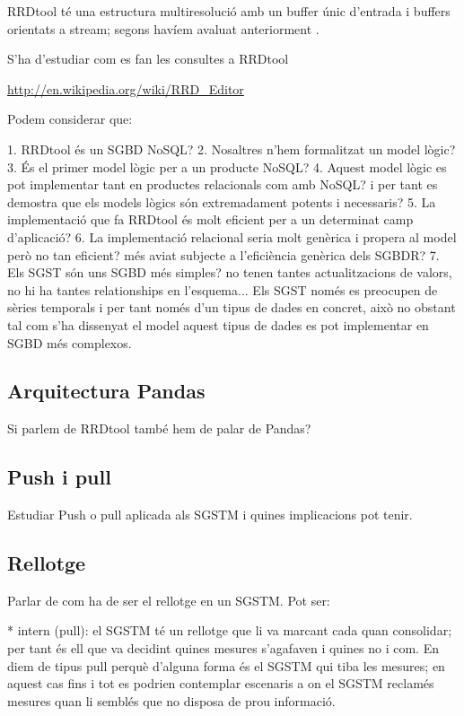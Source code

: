 RRDtool té una estructura multiresolució amb un buffer únic d'entrada
i buffers orientats a stream; segons havíem avaluat anteriorment \parencite{llusa11:tfm}.


S'ha d'estudiar com es fan les consultes a RRDtool

\url{http://en.wikipedia.org/wiki/RRD_Editor}



Podem considerar que:

1. RRDtool és un SGBD NoSQL?
2. Nosaltres n'hem formalitzat un model lògic?
3. És el primer model lògic per a un producte NoSQL?
4. Aquest model lògic es pot implementar tant en productes relacionals com amb NoSQL? i per tant es demostra que els models lògics són extremadament potents i necessaris?
5. La implementació que fa RRDtool és molt eficient per a un determinat camp d'aplicació?
6. La implementació relacional seria molt genèrica i propera al model però no tan eficient? més aviat subjecte a l'eficiència genèrica dels SGBDR?
7. Els SGST són uns SGBD més simples? no tenen tantes actualitzacions de valors, no hi ha tantes relationships en l'esquema... Els SGST només es preocupen de sèries temporals i per tant només d'un tipus de dades en concret, això no obstant tal com s'ha dissenyat el model aquest tipus de dades es pot implementar en SGBD més complexos. 

\subsection{Arquitectura Pandas}

\todo{}
Si parlem de RRDtool també hem de palar de Pandas?




\subsection{Push i pull}

Estudiar Push o pull aplicada als SGSTM i quines implicacions pot tenir.


\subsection{Rellotge}

Parlar de com ha de ser el rellotge en un SGSTM. Pot ser:

* intern (pull): el SGSTM té un rellotge que li va marcant cada quan consolidar; per tant és ell que va decidint quines mesures s'agafaven i quines no i com. En diem de tipus pull perquè d'alguna forma és el SGSTM qui tiba les mesures; en aquest cas fins i tot es podrien contemplar escenaris a on el SGSTM reclamés mesures quan li semblés que no disposa de prou informació.

